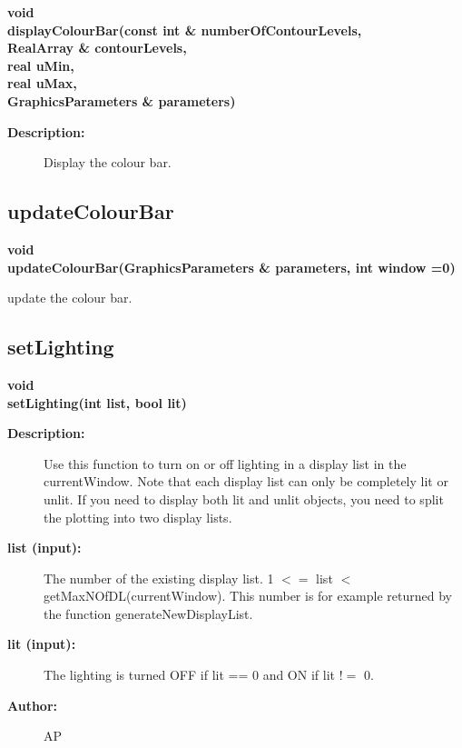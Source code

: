 \begin{flushleft} \textbf{%
void   \\ 
\settowidth{\GLGraphicsInterfaceIncludeArgIndent}{displayColourBar(}%
displayColourBar(const int \& numberOfContourLevels,\\ 
\hspace{\GLGraphicsInterfaceIncludeArgIndent}RealArray \& contourLevels,\\ 
\hspace{\GLGraphicsInterfaceIncludeArgIndent}real uMin,\\ 
\hspace{\GLGraphicsInterfaceIncludeArgIndent}real uMax,\\ 
\hspace{\GLGraphicsInterfaceIncludeArgIndent}GraphicsParameters \& parameters)
}\end{flushleft}
\begin{description}
\item[{\bf Description:}] 
 Display the colour bar.
\end{description}
\subsection{updateColourBar}
 
\begin{flushleft} \textbf{%
void   \\ 
\settowidth{\GLGraphicsInterfaceIncludeArgIndent}{updateColourBar(}%
updateColourBar(GraphicsParameters \& parameters, int window  =0)
}\end{flushleft}
 update the colour bar.
\subsection{setLighting}
 
\begin{flushleft} \textbf{%
void  \\ 
\settowidth{\GLGraphicsInterfaceIncludeArgIndent}{setLighting(}%
setLighting(int list, bool lit)
}\end{flushleft}
\begin{description}
\item[{\bf Description:}] 
    Use this function to turn on or off lighting in a display list in the currentWindow. Note that
    each display list can only be completely lit or unlit. If you need to display both lit and unlit
    objects, you need to split the plotting into two display lists.

\item[{\bf list (input):}] 
    The number of the existing display list. 1 $<=$ list $<$ getMaxNOfDL(currentWindow). 
    This number is for example returned by the function generateNewDisplayList.
\item[{\bf lit (input):}] 
    The lighting is turned OFF if lit == 0 and ON if lit $!=$ 0.
\item[{\bf Author:}]  AP
\end{description}
